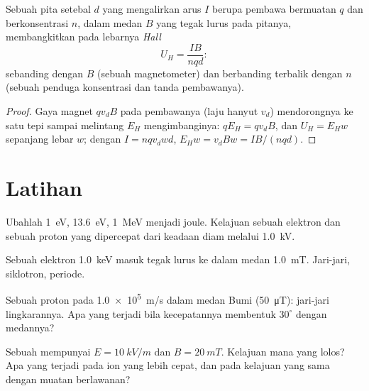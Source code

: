 \begin{proposition}\label{prop:b1:charged-particles:hall}
Sebuah pita setebal $d$ yang mengalirkan arus $I$ berupa pembawa bermuatan
$q$ dan berkonsentrasi $n$, dalam medan $B$ yang tegak lurus pada pitanya,
membangkitkan pada lebarnya \emph{ Hall}
\[
U_H = \frac{IB}{nqd} :
\]
sebanding dengan $B$ (sebuah magnetometer) dan berbanding terbalik dengan $n$
(sebuah penduga konsentrasi dan tanda pembawanya).
\end{proposition}

\begin{proof}
Gaya magnet $qv_dB$ pada pembawanya (laju hanyut $v_d$) mendorongnya
ke satu tepi sampai  melintang $E_H$ mengimbanginya:
$qE_H = qv_dB$, dan $U_H = E_Hw$ sepanjang lebar $w$; dengan $I = nqv_dwd$,
$E_Hw = v_dBw = IB/(nqd)$.
\end{proof}

\section{Latihan}

\begin{exercise}[$\star$]\label{exo:b1:charged-particles:1}
Ubahlah \qty{1}{eV}, \qty{13.6}{eV}, \qty{1}{MeV} menjadi joule. Kelajuan
sebuah elektron dan sebuah proton yang dipercepat dari keadaan diam melalui \qty{1.0}{kV}.
\end{exercise}

\begin{exercise}[$\star$]\label{exo:b1:charged-particles:2}
Sebuah elektron \qty{1.0}{keV} masuk tegak lurus ke dalam medan \qty{1.0}{mT}.
Jari-jari,  siklotron, periode.
\end{exercise}

\begin{exercise}[$\star$]\label{exo:b1:charged-particles:3}
Sebuah proton pada \qty{1.0e5}{m/s} dalam medan Bumi (\qty{50}{\micro T}):
jari-jari lingkarannya. Apa yang terjadi bila kecepatannya membentuk $30^\circ$
dengan medannya?
\end{exercise}

\begin{exercise}[$\star$]\label{exo:b1:charged-particles:4}
Sebuah  mempunyai $E = \qty{10}{kV/m}$ dan $B = \qty{20}{mT}$.
Kelajuan mana yang lolos? Apa yang terjadi pada ion yang lebih cepat, dan pada
kelajuan yang sama dengan muatan berlawanan?
\end{exercise}

